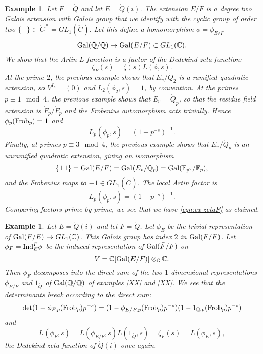 \documentclass{amsart}
\newtheorem{example}[exercise]{Example}
\begin{document}
\begin{example} Let $F=\ring{Q}$ and let $E=\ring{Q}(i)$.  The extension
$E/F$ is a degree two Galois extension with Galois group that we identify
with the cyclic group of order two $\{\pm\}\subset\ring{C}^\times=GL_1(\ring{C})$.
Let this define a homomorphism $\phi=\phi_{E/F}$
\[
{\operatorname{Gal}}(\bar{\mathbb{Q}}/\mathbb{Q})\to {\operatorname{Gal}}(E/F) \subset GL_1(\mathbb{C}).
\]
We show that the Artin $L$ function is a factor of the Dedekind zeta function:
\begin{equation}\label{eqn:ex-zetaF}
\zeta_F(s) = \zeta(s) L(\phi,s).
\end{equation}
At the prime $2$, the previous example shows that $E_v/\ring{Q}_2$ is a ramified
quadratic extension, so $V^{I_p}=(0)$ and $L_2(\phi_2,s)=1$, by convention.
At the primes $p\equiv 1 \mod 4$, the previous example shows that $E_v=\ring{Q}_p$,
so that the residue field extension is $\ring{F}_p/\ring{F}_p$ and the Frobenius
automorphism acts trivially.  Hence $\phi_p({\operatorname{Frob}}_p)=1$ and 
\[
L_p(\phi_p,s)=(1-p^{-s})^{-1}.
\]
Finally, at primes $p\equiv 3\mod 4$, the previous example shows that $E_v/\ring{Q}_p$
is an unramified quadratic extension, giving an isomorphism
\[
\{\pm1\}={\operatorname{Gal}}(E/F) = {\operatorname{Gal}}(E_v/\mathbb{Q}_p) = {\operatorname{Gal}}(\mathbb{F}_{p^2}/\mathbb{F}_p),
\]
and the Frobenius maps to $-1\in GL_1(\ring{C})$.  The local Artin factor is
\[
L_p(\phi_p,s) = (1+p^{-s})^{-1}.
\]
Comparing factors prime by prime, we see that we have
\eqref{eqn:ex-zetaF} as claimed.
\end{example}

\begin{example} Let $E=\ring{Q}(i)$ and let $F=\ring{Q}$.  Let $\phi_E$ be the
trivial representation of ${\operatorname{Gal}}(\bar{F}/E)\to GL_1(\mathbb{C})$.  This Galois
group has index $2$ in ${\operatorname{Gal}}(\bar F/F)$.  Let 
$\phi_F={\operatorname{Ind}}_E^F\phi$ be the induced representation
of ${\operatorname{Gal}}(\bar{F}/F)$ on
\[
V=\mathbb{C}[{\operatorname{Gal}}(E/F)]\otimes_{\mathbb{C}} \mathbb{C}.
\]
Then $\phi_F$ decomposes into the direct sum of the two $1$-dimensional representations
$\phi_{E/F}$ and $1_{\ring{Q}}$
of ${\operatorname{Gal}}(\mathbb{Q}/\mathbb{Q})$
of examples \ref{XX} and \ref{XX}.  We see that
the determinants break according to the direct sum:
\[
\det(1 - \phi_{F,p}({\operatorname{Frob}}_p)p^{-s}) = 
(1 - \phi_{E/F,p}({\operatorname{Frob}}_p)p^{-s})(1-1_{{\mathbb{Q},p}}({\operatorname{Frob}}_p)p^{-s})
\]
and 
\[
L(\phi_F,s) = L(\phi_{E/F},s) L(1_{\ring{Q}},s) = \zeta_F(s) = L(\phi_E,s),
\]
the Dedekind zeta function of $\ring{Q}(i)$ once again.
\end{example}
\end{document}
